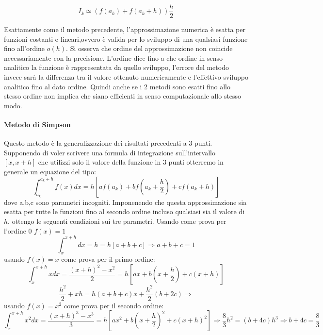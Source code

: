 \documentclass{article}
\begin{document}
	\begin{equation}
	I_{k}\simeq (f(a_{k})+f(a_{k}+h))\frac{h}{2}
	\end{equation}

Esattamente come il metodo precedente, l'approssimazione numerica è esatta per funzioni costanti e lineari,ovvero è valida per lo sviluppo di una qualsiasi funzione fino all'ordine $o(h)$.
Si osserva che ordine del approssimazione non coincide necessariamente con la precisione. L'ordine dice fino a che ordine in senso analitico la funzione è rappresentata da quello sviluppo, l'errore del metodo invece sarà la differenza tra il valore ottenuto numericamente e l'effettivo sviluppo analitico fino al dato ordine.
Quindi anche se i 2 metodi sono esatti fino allo stesso ordine non implica che siano efficienti in senso computazionale allo stesso modo.

\paragraph{Metodo di Simpson}
Questo metodo è la generalizzazione dei risultati precedenti a 3 punti.
Supponendo di voler scrivere una formula di integrazione sull'intervallo $[x,x+h]$ che utilizzi solo il valore della funzione in 3 punti otterremo in generale un equazione del tipo:
	\begin{equation}
	\int_{a_{k}}^{a_{k}+h}f(x)dx= h[af(a_{k})+bf(a_{k}+\frac{h}{2})+cf(a_{k}+h)]
	\end{equation}
dove a,b,c sono parametri incogniti.
Imponenendo che questa approssimazione sia esatta per tutte le funzioni fino al secondo ordine incluso qualsiasi sia il valore di $h$, ottengo le seguenti condizioni sui tre parametri.
\newline
Usando come prova per l'ordine 0 $f(x)=1$
	\begin{displaymath}
	\int_{x}^{x+h}dx=h=h[a+b+c]\Longrightarrow a+b+c=1
	\end{displaymath}
usando $f(x)=x$ come prova per il primo ordine: 
	\begin{displaymath}
	\int_{x}^{x+h}xdx=\dfrac{(x+h)^{2}-x^{2}}{2}=h[ax+b(x+\frac{h}{2})+c(x+h)]
	\end{displaymath}
	\begin{displaymath}
	\frac{h^{2}}{2}+xh= h(a+b+c)x+\frac{h^{2}}{2}(b+2c)\Longrightarrow
	\end{displaymath}
usando $f(x)=x^{2}$ come prova per il secondo ordine: 
	\begin{displaymath}
	\int_{x}^{x+h}x^{2}dx=\dfrac{(x+h)^{3}-x^{3}}{3}=h[ax^{2}+b(x+\frac{h}{2})^{2}+c(x+h)^{2}] \Longrightarrow \frac{8}{3}h^{2}=(b+4c)h^{3}\Rightarrow b+4c = \frac{8}{3}
	\end{displaymath}
\end{document}
